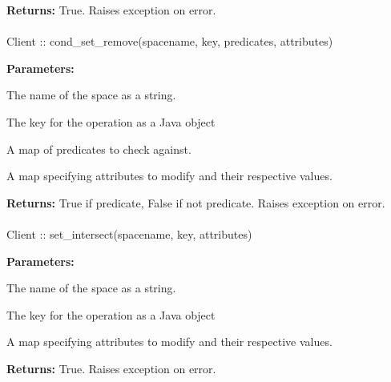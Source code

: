 \noindent\textbf{Returns:}
True.  Raises exception on error.

\paragraph{}
\label{api:java:cond_set_remove}
\begin{javacode}
Client :: cond_set_remove(spacename, key, predicates, attributes)
\end{javacode}


\noindent\textbf{Parameters:}
\begin{description}[labelindent=\widthof{{\code{predicates}}},leftmargin=*,noitemsep,nolistsep,align=right]
\item[\code{spacename}] The name of the space as a string.
\item[\code{key}] The key for the operation as a Java object
\item[\code{predicates}] A map of predicates to check against.
\item[\code{attributes}] A map specifying attributes to modify and their respective values.
\end{description}

\noindent\textbf{Returns:}
True if predicate, False if not predicate.  Raises exception on error.

\paragraph{}
\label{api:java:set_intersect}
\begin{javacode}
Client :: set_intersect(spacename, key, attributes)
\end{javacode}


\noindent\textbf{Parameters:}
\begin{description}[labelindent=\widthof{{\code{attributes}}},leftmargin=*,noitemsep,nolistsep,align=right]
\item[\code{spacename}] The name of the space as a string.
\item[\code{key}] The key for the operation as a Java object
\item[\code{attributes}] A map specifying attributes to modify and their respective values.
\end{description}

\noindent\textbf{Returns:}
True.  Raises exception on error.

